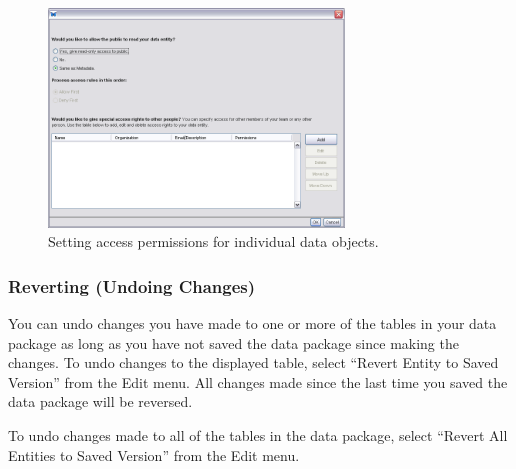 \begin{figure}
  \centering
    \includegraphics[width=0.7\textwidth]{images/dialog-access-table.png}
  \caption{Setting access permissions for individual data objects.}
  \label{fig:dialog-access-table}
\end{figure}

\subsubsection{Reverting (Undoing Changes)}
\label{sec:edit-table-revert}

You can undo changes you have made to one or more of the tables in your
data package as long as you have not saved the data package since making
the changes. To undo changes to the displayed table, select ``Revert
Entity to Saved Version'' from the Edit menu. All changes made since the
last time you saved the data package will be reversed. 

To undo changes made to all of the tables in the data package, select
``Revert All Entities to Saved Version'' from the Edit menu.

